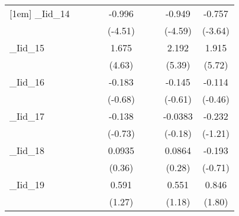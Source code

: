 {\begin{tabular}{l*{8}{c}}
[1em]
\_Iid\_14     &                     &                     &                     &      -0.996\sym{***}&                     &                     &      -0.949\sym{***}&      -0.757\sym{***}\\
            &                     &                     &                     &     (-4.51)         &                     &                     &     (-4.59)         &     (-3.64)         \\
[1em]
\_Iid\_15     &                     &                     &                     &       1.675\sym{***}&                     &                     &       2.192\sym{***}&       1.915\sym{***}\\
            &                     &                     &                     &      (4.63)         &                     &                     &      (5.39)         &      (5.72)         \\
[1em]
\_Iid\_16     &                     &                     &                     &      -0.183         &                     &                     &      -0.145         &      -0.114         \\
            &                     &                     &                     &     (-0.68)         &                     &                     &     (-0.61)         &     (-0.46)         \\
[1em]
\_Iid\_17     &                     &                     &                     &      -0.138         &                     &                     &     -0.0383         &      -0.232         \\
            &                     &                     &                     &     (-0.73)         &                     &                     &     (-0.18)         &     (-1.21)         \\
[1em]
\_Iid\_18     &                     &                     &                     &      0.0935         &                     &                     &      0.0864         &      -0.193         \\
            &                     &                     &                     &      (0.36)         &                     &                     &      (0.28)         &     (-0.71)         \\
[1em]
\_Iid\_19     &                     &                     &                     &       0.591         &                     &                     &       0.551         &       0.846         \\
            &                     &                     &                     &      (1.27)         &                     &                     &      (1.18)         &      (1.80)         \\

\end{tabular}}

